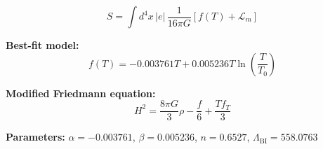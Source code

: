 
\begin{equation}
  S = \int d^4x \, |e| \, \frac{1}{16\pi G} \left[ f(T) + \mathcal{L}_m \right]
\end{equation}

\textbf{Best-fit model:}
\begin{equation}
  f(T) = -0.003761 T + 0.005236 T \ln\!\left(\frac{T}{T_0}\right)
\end{equation}

\textbf{Modified Friedmann equation:}
\begin{equation}
  H^2 = \frac{8\pi G}{3} \rho - \frac{f}{6} + \frac{T f_T}{3}
\end{equation}

\textbf{Parameters:}
$\alpha = -0.003761$, \quad
$\beta = 0.005236$, \quad
$n = 0.6527$, \quad
$\Lambda_{\text{BI}} = 558.0763$